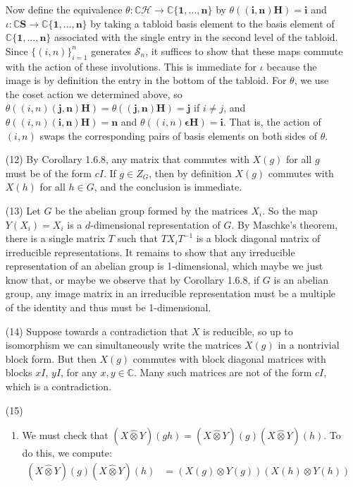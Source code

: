 \documentclass{amsart}
\newcommand{\CC}{\mathbb{C}}
\renewcommand{\S}{\mathcal{S}}
\renewcommand{\H}{\mathcal{H}}
\begin{document}
\begin{enumerate}
    Now define the equivalence $\theta: \CC\H \to \CC\{\mathbf{1}, \dots, \mathbf{n}\}$ by $\theta(\mathbf{(i,n)H}) = \mathbf{i}$ and $\iota:\CC\mathbf{S} \to \CC\{\mathbf{1}, \dots, \mathbf{n}\}$ by taking a tabloid basis element to the basis element of $\CC\{\mathbf{1}, \dots, \mathbf{n}\}$ associated with the single entry in the second level of the tabloid.  Since $\{(i,n)\}_{i=1}^n$ generates $\S_n$, it suffices to show that these maps commute with the action of these involutions.  This is immediate for $\iota$ because the image is by definition the entry in the bottom of the tabloid.  For $\theta$, we use the coset action we determined above, so $\theta((i,n)\mathbf{(j,n)H}) = \theta(\mathbf{(j,n)H}) = \mathbf{j}$ if $i\ne j$, and $\theta((i,n)\mathbf{(i,n)H}) = \mathbf{n}$ and $\theta((i,n)\mathbf{\epsilon H}) = \mathbf{i}$.  That is, the action of $(i,n)$ swaps the corresponding pairs of basis elements on both sides of $\theta$.
    \item[(12)] By Corollary 1.6.8, any matrix that commutes with $X(g)$ for all $g$ must be of the form $cI$.  If $g \in Z_G$, then by definition $X(g)$ commutes with $X(h)$ for all $h \in G$, and the conclusion is immediate.
    \item[(13)] Let $G$ be the abelian group formed by the matrices $X_i$.  So the map $Y(X_i) = X_i$ is a $d$-dimensional representation of $G$.  By Maschke's theorem, there is a single matrix $T$ such that $TX_iT^{-1}$ is a block diagonal matrix of irreducible representations.  It remains to show that any irreducible representation of an abelian group is 1-dimensional, which maybe we just know that, or maybe we observe that by Corollary 1.6.8, if $G$ is an abelian group, any image matrix in an irreducible representation must be a multiple of the identity and thus must be 1-dimensional.
    \item[(14)] Suppose towards a contradiction that $X$ is reducible,
    so up to isomorphism we can simultaneously write the matrices $X(g)$
    in a nontrivial block form.  But then $X(g)$ commutes with block diagonal matrices with blocks $xI$, $yI$, for any $x,y \in \CC$.  Many such matrices are not of the form $cI$, which is a contradiction.
    \item[(15)]
    \begin{enumerate}
    \item We must check that $(X \hat{\otimes} Y)(gh) = (X \hat{\otimes} Y)(g) (X \hat{\otimes} Y)(h)$.  To do this, we compute:
    \begin{align*}
    (X \hat{\otimes} Y)(g) (X \hat{\otimes} Y)(h) &= (X(g) \otimes Y(g))(X(h) \otimes Y(h)) \\

\end{align*}
\end{enumerate}
\end{enumerate}
\end{document}
